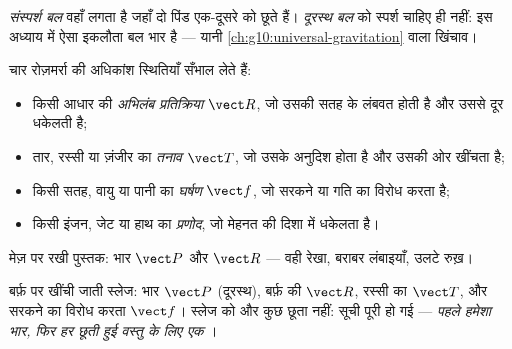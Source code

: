 \begin{definition}[संस्पर्श और दूरस्थ बल]\label{def:g10:inertia:contact}
\emph{संस्पर्श बल} वहाँ लगता है जहाँ दो पिंड एक-दूसरे
को छूते हैं। \emph{दूरस्थ बल} को स्पर्श चाहिए ही नहीं:
इस अध्याय में ऐसा इकलौता बल भार है --- यानी \cref{ch:g10:universal-gravitation} वाला
 खिंचाव।
\end{definition}

\begin{definition}[आम संस्पर्श बल]\label{def:g10:inertia:inventory}
चार  रोज़मर्रा की अधिकांश स्थितियाँ सँभाल लेते हैं:
\begin{itemize}
  \item किसी आधार की \emph{अभिलंब प्रतिक्रिया}
        $\vect R$, जो उसकी सतह के लंबवत होती है और उससे दूर धकेलती है;
  \item तार, रस्सी या ज़ंजीर का \emph{तनाव} $\vect T$, जो उसके
        अनुदिश होता है और उसकी ओर खींचता है;
  \item किसी सतह, वायु या पानी का \emph{घर्षण} $\vect f$, जो
        सरकने या गति का विरोध करता है;
  \item किसी इंजन, जेट या हाथ का \emph{प्रणोद}, जो मेहनत
        की दिशा में धकेलता है।
\end{itemize}
\end{definition}

\begin{omfigure}

{\small मेज़ पर रखी पुस्तक: भार $\vect P$ और  $\vect R$ --- वही रेखा, बराबर लंबाइयाँ, उलटे रुख़।}
\end{omfigure}

\begin{example}[खींची जाती स्लेज की सूची]\label{ex:g10:inertia:sled}
बर्फ़ पर खींची जाती स्लेज: भार $\vect P$ (दूरस्थ), बर्फ़ की
 $\vect R$, रस्सी का  $\vect T$, और
सरकने का विरोध करता  $\vect f$। स्लेज को और कुछ छूता नहीं:
सूची पूरी हो गई --- \emph{पहले हमेशा भार, फिर हर छूती हुई वस्तु
के लिए एक }।
\end{example}

